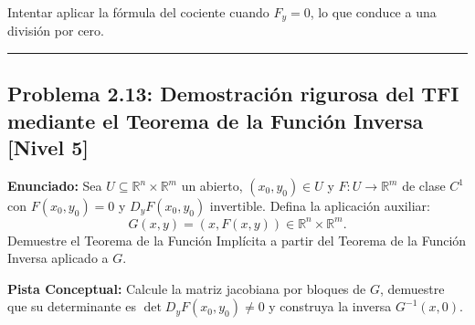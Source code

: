 \documentclass[11pt,a4paper]{article}
\begin{document}
\begin{trapbox}
Intentar aplicar la fórmula del cociente cuando $F_y = 0$, lo que conduce a una división por cero.
\end{trapbox}

\vspace{0.5cm}
\hrule
\vspace{0.5cm}

\subsection*{Problema 2.13: Demostración rigurosa del TFI mediante el Teorema de la Función Inversa \hfill \color{primaryblue}\small[Nivel 5]}

\begin{tcolorbox}[colback=white,colframe=gray!40,arc=1mm,boxrule=0.5pt,left=3mm,right=3mm,top=2mm,bottom=2mm]
\textbf{Enunciado:} Sea $U \subseteq \mathbb{R}^n \times \mathbb{R}^m$ un abierto, $(x_0, y_0) \in U$ y $F: U \to \mathbb{R}^m$ de clase $C^1$ con $F(x_0, y_0) = 0$ y $D_y F(x_0, y_0)$ invertible. Defina la aplicación auxiliar:
\begin{equation*}
G(x,y) = (x, F(x,y)) \in \mathbb{R}^n \times \mathbb{R}^m.
\end{equation*}
Demuestre el Teorema de la Función Implícita a partir del Teorema de la Función Inversa aplicado a $G$.
\end{tcolorbox}

\begin{tcolorbox}[colback=yellow!4,colframe=accentamber!70,arc=1mm,boxrule=0.5pt,left=3mm,right=3mm,top=1.5mm,bottom=1.5mm]
\textbf{Pista Conceptual:} Calcule la matriz jacobiana por bloques de $G$, demuestre que su determinante es $\det D_y F(x_0, y_0) \neq 0$ y construya la inversa $G^{-1}(x, 0)$.
\end{tcolorbox}
\end{document}
